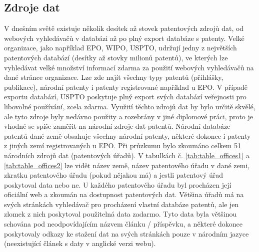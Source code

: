 \subsection{Zdroje dat}
V dnešním světě existuje několik desítek až stovek patentových zdrojů dat, od webových vyhledávačů v databázi až po plný export databáze s patenty. Velké organizace, jako například \gls{EPO}, \gls{WIPO}, \gls{USPTO}, udržují jedny z největších patentových databází (desítky až stovky milionů patentů), ve kterých lze vyhledávat velké množství informací zdarma za použití webových vyhledávačů na dané stránce organizace. Lze zde najít všechny typy patentů (přihlášky, publikace), národní patenty i patenty registrované například u \gls{EPO}. V případě exportu databází, \gls{USPTO} poskytuje plný export svých databází veřejnosti pro libovolné používání, zcela zdarma. Využití těchto zdrojů dat by bylo určitě skvělé, ale tyto zdroje byly nedávno použity a rozebrány v jiné diplomové práci, proto je vhodné se spíše zaměřit na národní zdroje dat patentů.
\newline
\indent Národní databáze patentů dané země obsahuje všechny národní patenty, některé dokonce i patenty z jiných zemí registrovaných u \gls{EPO}. 
\newline
\indent Při průzkumu bylo zkoumáno celkem 51 národních zdrojů dat (patentových úřadů). V tabulkách č. \ref{tab:table_offices1} a \ref{tab:table_offices2} lze vidět název země, název patentového úřadu v dané zemi, zkratku patentového úřadu (pokud nějakou má) a jestli patentový úřad poskytoval data nebo ne. U každého patentového úřadu byl procházen její oficiální web a zkoumán na dostupnost patentových dat. Většina úřadů má na svých stránkách vyhledávač pro procházení vlastní databáze patentů, ale jen zlomek z nich poskytoval použitelná data zadarmo. Tyto data byla většinou schována pod neodpovídajícím názvem článku / příspěvku, a některé dokonce poskytovaly odkazy ke stažení dat na svých stránkách pouze v národním jazyce (neexistující článek s daty v anglické verzi webu). 
